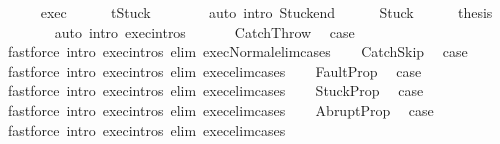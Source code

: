 \begin{isabellebody}
\isanewline
\ \ \ \ \isamarkupfalse%
\ exec{\isacharprime}\isanewline
\ \ \ \ \isamarkupfalse%
\ {\isachardoublequoteopen}t{\isacharequal}Stuck{\isachardoublequoteclose}\isanewline
\ \ \ \ \ \ \isamarkupfalse%
\ {\isacharparenleft}auto\ intro{\isacharcolon}\ Stuck{\isacharunderscore}end{\isacharparenright}\isanewline
\ \ \ \ \isamarkupfalse%
\ Stuck\isanewline
\ \ \ \ \isamarkupfalse%
\ {\isacharquery}thesis\isanewline
\ \ \ \ \ \ \isamarkupfalse%
\ {\isacharparenleft}auto\ intro{\isacharcolon}\ exec{\isachardot}intros{\isacharparenright}\isanewline
\ \ \isamarkupfalse%
\isanewline
{}\isamarkupfalse%
\isanewline
\ \ \isamarkupfalse%
\ CatchThrow\ \isamarkupfalse%
\ {\isacharquery}case\isanewline
\ \ \ \ \isamarkupfalse%
\ {\isacharparenleft}fastforce\ intro{\isacharcolon}\ exec{\isachardot}intros\ elim{\isacharcolon}\ exec{\isacharunderscore}Normal{\isacharunderscore}elim{\isacharunderscore}cases{\isacharparenright}\isanewline
{}\isamarkupfalse%
\isanewline
\ \ \isamarkupfalse%
\ CatchSkip\ \isamarkupfalse%
\ {\isacharquery}case\isanewline
\ \ \ \ \isamarkupfalse%
\ {\isacharparenleft}fastforce\ intro{\isacharcolon}\ exec{\isachardot}intros\ elim{\isacharcolon}\ exec{\isacharunderscore}elim{\isacharunderscore}cases{\isacharparenright}\isanewline
{}\isamarkupfalse%
\isanewline
\ \ \isamarkupfalse%
\ FaultProp\ \isamarkupfalse%
\ {\isacharquery}case\isanewline
\ \ \ \ \isamarkupfalse%
\ {\isacharparenleft}fastforce\ intro{\isacharcolon}\ exec{\isachardot}intros\ elim{\isacharcolon}\ exec{\isacharunderscore}elim{\isacharunderscore}cases{\isacharparenright}\isanewline
{}\isamarkupfalse%
\isanewline
\ \ \isamarkupfalse%
\ StuckProp\ \isamarkupfalse%
\ {\isacharquery}case\isanewline
\ \ \ \ \isamarkupfalse%
\ {\isacharparenleft}fastforce\ intro{\isacharcolon}\ exec{\isachardot}intros\ elim{\isacharcolon}\ exec{\isacharunderscore}elim{\isacharunderscore}cases{\isacharparenright}\isanewline
{}\isamarkupfalse%
\isanewline
\ \ \isamarkupfalse%
\ AbruptProp\ \isamarkupfalse%
\ {\isacharquery}case\isanewline
\ \ \ \ \isamarkupfalse%
\ {\isacharparenleft}fastforce\ intro{\isacharcolon}\ exec{\isachardot}intros\ elim{\isacharcolon}\ exec{\isacharunderscore}elim{\isacharunderscore}cases{\isacharparenright}\isanewline

\end{isabellebody}
